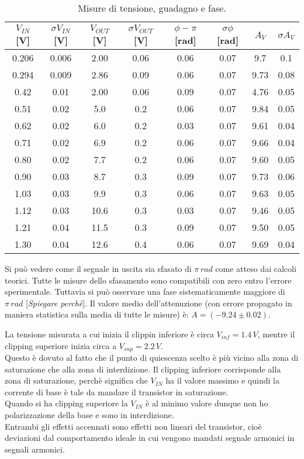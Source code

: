 \documentclass[10pt,a4paper]{article}
\newcommand{\rem}[1]{[\emph{#1}]}
\begin{document}
\begin{table}[!hbt]
\centering
\begin{tabular}{|c|c|c|c|c|c|c|c|}
\hline 
$V_{IN}$ [V] & $\sigma V_{IN}$ [V] & $V_{OUT}$ [V]& $\sigma V_{OUT}$ [V] & $\phi - \pi$ [rad] & $\sigma \phi$ [rad] & $A_V$ & $\sigma A_V$ \\ 
\hline
0.206 & 0.006 & 2.00 & 0.06 & 0.06 & 0.07 & 9.7 & 0.1\\
0.294 & 0.009 & 2.86 & 0.09 & 0.06 & 0.07 & 9.73 & 0.08\\
0.42 & 0.01 & 2.00 & 0.06 & 0.09 & 0.07 & 4.76 & 0.05\\
0.51 & 0.02 & 5.0 & 0.2 & 0.06 & 0.07 & 9.84 & 0.05\\
0.62 & 0.02 & 6.0 & 0.2 & 0.03 & 0.07 & 9.61 & 0.04\\
0.71 & 0.02 & 6.9 & 0.2 & 0.06 & 0.07 & 9.66 & 0.04\\
0.80 & 0.02 & 7.7 & 0.2 & 0.06 & 0.07 & 9.60 & 0.05\\
0.90 & 0.03 & 8.7 & 0.3 & 0.09 & 0.07 & 9.73 & 0.06\\
1.03 & 0.03 & 9.9 & 0.3 & 0.06 & 0.07 & 9.63 & 0.05\\
1.12 & 0.03 & 10.6 & 0.3 & 0.03 & 0.07 & 9.46 & 0.05\\
1.21 & 0.04 & 11.5 & 0.3 & 0.09 & 0.07 & 9.50 & 0.05\\
1.30 & 0.04 & 12.6 & 0.4 & 0.06 & 0.07 & 9.69 & 0.04\\
\hline
\end{tabular}
\caption{Misure di tensione, guadagno e fase.} \label{ampiezza}
\end{table}
Si può vedere come il segnale in uscita sia sfasato di $\pi \, rad$ come atteso dai calcoli teorici. Tutte le misure dello sfasamento sono compatibili con zero entro l'errore sperimentale. Tuttavia si può osservare una fase sistematicamente maggiore di $\pi \, rad$ \rem{Spiegare perchè}.
Il valore medio dell'attenuzione (con errore propagato in maniera statistica sulla media di tutte le misure) è: $A = (-9.24 \pm 0.02)$.

La tensione misurata a cui inizia il clippin inferiore è circa $V_{inf} = 1.4 \,V$, mentre il clipping superiore inizia circa a $V_{sup} = 2.2 \, V$.\\
Questo è dovuto al fatto che il punto di quiescenza scelto è più vicino alla zona di saturazione che alla zona di interdizione. Il clipping inferiore corrisponde alla zona di saturazione, perchè significa che $V_{IN}$ ha il valore massimo e quindi la corrente di base è tale da mandare il transistor in saturazione.\\
Quando si ha clipping superiore la $V_{IN}$ è al minimo valore dunque non ho polarizzazione della base e sono in interdizione.\\
Entrambi gli effetti accennati sono effetti non lineari del transistor, cioè deviazioni dal comportamento ideale in cui vengono mandati segnale armonici in segnali armonici.\\
\end{document}
